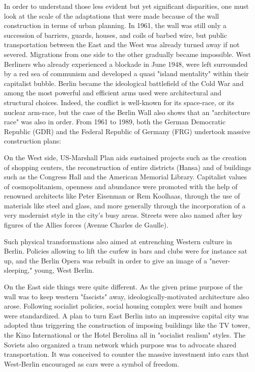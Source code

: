    In order to understand those less evident but yet significant
   disparities, one must look at the scale of the adaptations that were
   made because of the wall construction in terms of urban planning. In
   1961, the wall was still only a succession of barriers, guards, houses,
   and coils of barbed wire, but public transportation between the East
   and the West was already turned away if not severed. Migrations from
   one side to the other gradually became impossible. West Berliners who
   already experienced a blockade in June 1948, were left surrounded by a
   red sea of communism and developed a quasi "island mentality" within
   their capitalist bubble. Berlin became the ideological battlefield of
   the Cold War and among the most powerful and efficient arms used were
   architectural and structural choices. Indeed, the conflict is
   well-known for its space-race, or its nuclear arm-race, but the case of
   the Berlin Wall  also shows that an "architecture race" was also in
   order. From 1961 to 1989, both the German Democratic Republic (GDR) and
   the Federal Republic of Germany (FRG) undertook massive construction
   plans:

   On the West side, US-Marshall Plan aids sustained projects such as the
   creation of shopping centers, the reconstruction of entire districts
   (Hansa) and of buildings such as the Congress Hall and the American
   Memorial Library. Capitalist values of cosmopolitanism, openness and
   abundance were promoted with the help of renowned architects like Peter
   Eisenman or Rem Koolhaas, through the use of materials like steel and
   glass, and more generally through the incorporation of a very modernist
   style in the city's busy areas. Streets were also named after key
   figures of the Allies forces (Avenue Charles de Gaulle).

   Such physical transformations also aimed at entrenching Western culture
   in Berlin. Policies allowing to lift the curfew in bars and clubs were
   for instance sat up, and the Berlin Opera was rebuilt in order to give
   an image of a "never-sleeping," young, West Berlin.

   On the East side things were quite different. As the given prime
   purpose of the wall was to keep western "fascists" away,
   ideologically-motivated architecture also arose. Following socialist
   policies, social housing complex were built and homes were
   standardized. A plan to turn East Berlin into an impressive capital
   city was adopted thus triggering the construction of imposing buildings
   like the TV tower, the Kino International or the Hotel Berolina all in
   "socialist realism" styles. The Soviets also organized a tram network
   which purpose was to advocate shared transportation. It was conceived
   to counter the massive investment into cars that West-Berlin encouraged
   as cars were a symbol of freedom.

